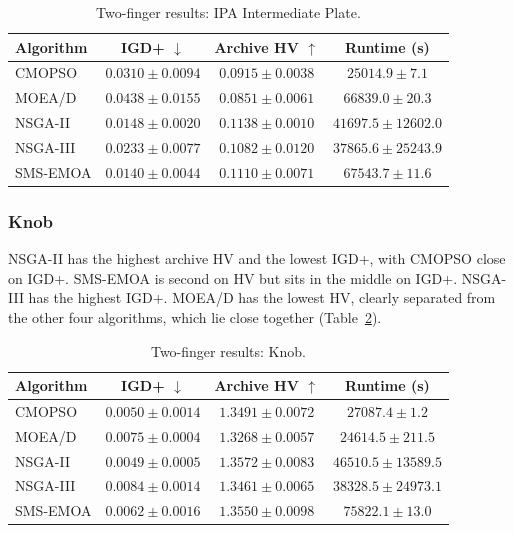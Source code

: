 \begin{table}[htbp]
    \centering
    \caption{Two-finger results: IPA Intermediate Plate.}
    \label{tab:tf_evo_intermediate_plate}
    \begin{tabular}{@{}lccc@{}}
        \toprule
        \textbf{Algorithm} & \textbf{IGD+} $\downarrow$ & \textbf{Archive HV} $\uparrow$ & \textbf{Runtime (s)} \\
        \midrule
        CMOPSO   & $0.0310 \pm 0.0094$ & $0.0915 \pm 0.0038$ & $25014.9 \pm 7.1$ \\
        MOEA/D   & $0.0438 \pm 0.0155$ & $0.0851 \pm 0.0061$ & $66839.0 \pm 20.3$ \\
        NSGA-II  & $0.0148 \pm 0.0020$ & {\boldmath$0.1138 \pm 0.0010$} & $41697.5 \pm 12602.0$ \\
        NSGA-III & $0.0233 \pm 0.0077$ & $0.1082 \pm 0.0120$ & $37865.6 \pm 25243.9$ \\
        SMS-EMOA & {\boldmath$0.0140 \pm 0.0044$} & $0.1110 \pm 0.0071$ & $67543.7 \pm 11.6$ \\
        \bottomrule
    \end{tabular}
\end{table}

\subsubsection{Knob}
\label{subsubsec:results_tf_knob}

NSGA-II has the highest archive HV and the lowest IGD+, with CMOPSO close on IGD+. SMS-EMOA is
second on HV but sits in the middle on IGD+. NSGA-III has the highest IGD+. MOEA/D has the
lowest HV, clearly separated from the other four algorithms, which lie close together
(Table~\ref{tab:tf_evo_knob}).

\begin{table}[htbp]
    \centering
    \caption{Two-finger results: Knob.}
    \label{tab:tf_evo_knob}
    \begin{tabular}{@{}lccc@{}}
        \toprule
        \textbf{Algorithm} & \textbf{IGD+} $\downarrow$ & \textbf{Archive HV} $\uparrow$ & \textbf{Runtime (s)} \\
        \midrule
        CMOPSO   & $0.0050 \pm 0.0014$ & $1.3491 \pm 0.0072$ & $27087.4 \pm 1.2$ \\
        MOEA/D   & $0.0075 \pm 0.0004$ & $1.3268 \pm 0.0057$ & $24614.5 \pm 211.5$ \\
        NSGA-II  & {\boldmath$0.0049 \pm 0.0005$} & {\boldmath$1.3572 \pm 0.0083$} & $46510.5 \pm 13589.5$ \\
        NSGA-III & $0.0084 \pm 0.0014$ & $1.3461 \pm 0.0065$ & $38328.5 \pm 24973.1$ \\
        SMS-EMOA & $0.0062 \pm 0.0016$ & $1.3550 \pm 0.0098$ & $75822.1 \pm 13.0$ \\
        \bottomrule
    \end{tabular}
\end{table}

